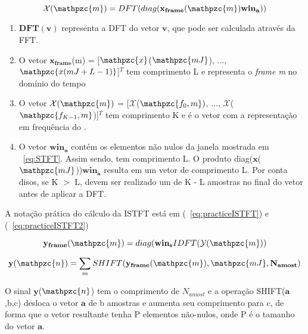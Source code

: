         \begin{equation}\label{eq:practiceSTFT}
            \mathcal{X}(\mathpzc{m})
            = DFT(diag(\mathbf{x_{frame}}(\mathpzc{m})\mathbf{win_a}))
         \end{equation}
    
        \begin{enumerate}
        
            \item $\mathbf{DFT(v)}$ representa a DFT do vetor $\mathbf{v}$, que pode ser calculada através da FFT.
            
            \item O vetor $\mathbf{x_{frame}}$(m) = [$\mathpzc{x}$($\mathpzc{mJ}$), $\dots$, $\mathpzc{x(mJ + L - 1)}$]$^T$ tem comprimento L e representa o \textit{frame m} no domínio do tempo
            
            \item O vetor $\mathcal{X}(\mathpzc{m})$ = [$\mathcal{X}$($\mathpzc{f_0,m})$, $\dots$, $\mathcal{X}$($\mathpzc{f_{K-1},m}$)]$^T$ tem comprimento K e é o vetor com a representação em
            frequência do .
            
            \item O vetor $\mathbf{win_a}$ contém os elementos não nulos da janela mostrada em ~\ref{eq:STFT}. Assim sendo, tem comprimento L. O produto diag($\mathbf{x}$($\mathpzc{mJ}$))$\mathbf{win_a}$ resulta em um vetor de comprimento L. Por conta disos, se K $>$ L, devem ser realizado um  de K - L amostras no final do vetor antes de aplicar a DFT.
        
        \end{enumerate}
        A notação prática do cálculo da ISTFT está em (~\ref{eq:practiceISTFT}) e (~\ref{eq:practiceISTFT2})
        
        \begin{equation}\label{eq:practiceISTFT}
            \mathbf{y_{frame}}(\mathpzc{m})
            = diag(\mathbf{win_s}IDFT(\mathcal{Y}(\mathpzc{m}))
         \end{equation}
        
        \begin{equation}\label{eq:practiceISTFT2}
            \mathbf{y}(\mathpzc{n})
            = \sum_{m}SHIFT(\mathbf{y_{frame}}(\mathpzc{m}),\mathpzc{mJ},\mathbf{N_{amost}})
         \end{equation}
        
        O sinal $\mathbf{y}$($\mathpzc{n}$) tem o comprimento de $N_{amost}$ e a operação SHIFT($\mathbf{a}$,b,c) desloca o vetor $\mathbf{a}$ de b amostras e aumenta seu comprimento para c, de forma que o vetor resultante tenha P elementos não-nulos, onde P é o tamanho do vetor $\mathbf{a}$.
        
